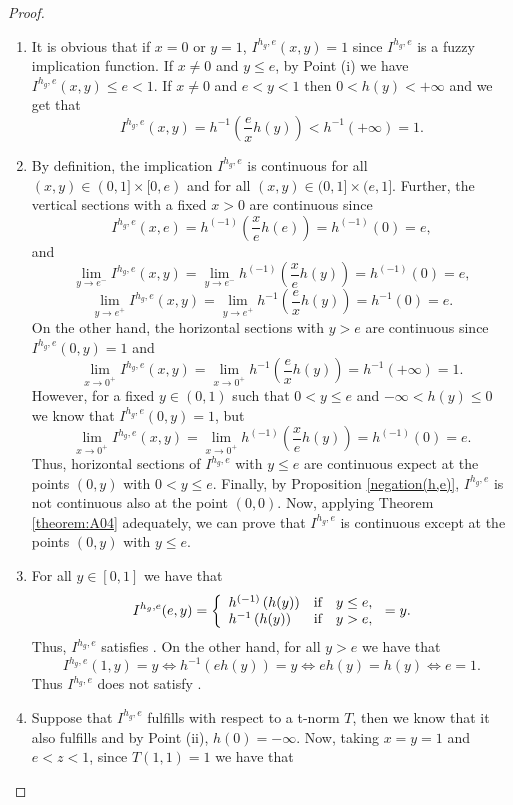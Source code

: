 \begin{proof}
\begin{enumerate}[label=(\roman*)]
\begin{itemize}
		\end{itemize}
		\item It is obvious that if $x=0$ or $y=1$, $I^{h_g,e}(x,y)=1$ since $I^{h_g,e}$ is a fuzzy implication function. If $x \not = 0$ and $y \leq e$, by Point (i) we have $I^{h_g,e}(x,y) \leq e <1$. If $x \not = 0$ and $e <y <1$ then $0< h(y) < + \infty$ and we get that
		$$I^{h_g,e}(x,y)= h^{-1}\left(\frac{e}{x}h(y)\right) < h^{-1}(+\infty)=1.$$
		\item By definition, the implication $I^{h_g,e}$ is continuous for all $(x,y) \in (0,1] \times [0,e)$ and for all $(x,y) \in (0,1] \times (e,1]$. 
		Further, the vertical sections with  a fixed $x>0$ are continuous since
		$$I^{h_g,e}(x,e) = h^{(-1)}\left(\frac{x}{e}h(e)\right) = h^{(-1)}(0)=e,$$
		and
		$$\lim_{y \to e^{-}} I^{h_g,e}(x,y) = \lim_{y \to e^-} h^{(-1)}\left(\frac{x}{e}h(y)\right) = h^{(-1)}(0)=e,$$
		$$\lim_{y \to e^{+}}I^{h_g,e}(x,y) = \lim_{y \to e^+} h^{-1}\left(\frac{e}{x}h(y)\right) = h^{-1}(0)=e.$$
		On the other hand, the horizontal sections with $y>e$ are continuous since $I^{h_g,e}(0,y)=1$ and
		$$\lim_{x \to 0^{+}}I^{h_g,e}(x,y) = \lim_{x \to 0^+} h^{-1}\left(\frac{e}{x}h(y)\right) = h^{-1}(+\infty)=1.$$
		However, for a fixed $y \in(0,1)$ such that $0 < y \leq e$ and $- \infty < h(y) \leq 0$ we know that $I^{h_g,e}(0,y)=1$, but
		$$\lim_{x \to 0^{+}} I^{h_g,e}(x,y) = \lim_{x \to 0^+} h^{(-1)}\left(
		\frac{x}{e}h(y)\right) = h^{(-1)}(0)=e.$$
		Thus, horizontal sections of $I^{h_g,e}$ with $y \leq e$ are continuous expect at the points $(0,y)$ with $0 <y \leq e$. Finally, by Proposition \ref{negation(h,e)}, $I^{h_g,e}$ is not continuous also at the point $(0,0)$. Now, applying Theorem \ref{theorem:A04} adequately, we can prove that $I^{h_g,e}$ is continuous except at the points $(0,y)$ with $y \leq e$.
		\item For all $y \in [0,1]$ we have that
		$$I^{h_g,e}(e,y)= \left\{ \begin{array}{lcl}
			h^{(-1)}\left(h(y)\right) &   \hbox{if}  & y \leq e,\\
			h^{-1}\left(h(y)\right) &  \hbox{if} & y > e,
		\end{array}
		\right. = y.
		$$
		Thus, $I^{h_g,e}$ satisfies \NPe. On the other hand, for all $y >e$ we have that
		$$I^{h_g,e}(1,y) =y \Leftrightarrow h^{-1}(eh(y))=y \Leftrightarrow eh(y)=h(y) \Leftrightarrow e=1.$$
		Thus $I^{h_g,e}$ does not satisfy \NP.
		\item  Suppose that $I^{h_g,e}$ fulfills \LI with respect to a t-norm $T$, then we know that it also fulfills  \EP and by Point (ii), $h(0)=-\infty$. Now, taking $x=y=1$ and $e<z<1$, since $T(1,1)=1$ we have that

\end{enumerate}
\end{proof}
